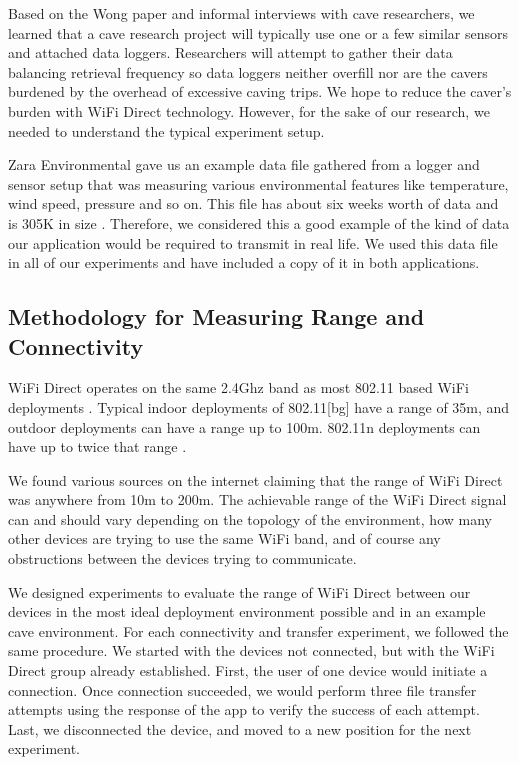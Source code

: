 \documentclass[10pt,twocolumn]{article}
\begin{document}
Based on the Wong paper and informal interviews with cave researchers, we learned that a cave research project will typically use one or a few similar sensors and attached data loggers.
Researchers will attempt to gather their data balancing retrieval frequency so data loggers neither overfill nor are the cavers burdened by the overhead of excessive caving trips.
We hope to reduce the caver's burden with WiFi Direct technology.
However, for the sake of our research, we needed to understand the typical experiment setup.

Zara Environmental gave us an example data file gathered from a logger and sensor setup that was measuring various environmental features like temperature, wind speed, pressure and so on.
This file has about six weeks worth of data and is 305K in size \cite{datafile}.
Therefore, we considered this a good example of the kind of data our application would be required to transmit in real life.
We used this data file in all of our experiments and have included a copy of it in both applications.

\subsection{Methodology for Measuring Range and Connectivity}
\label{sec:Methodology}
WiFi Direct operates on the same 2.4Ghz band as most 802.11 based WiFi deployments \cite{wifiwhitepaper}.
Typical indoor deployments of 802.11[bg] have a range of 35m, and outdoor deployments can have a range up to 100m.
802.11n deployments can have up to twice that range \cite{wikiwifi}.

We found various sources on the internet claiming that the range of WiFi Direct was anywhere from 10m to 200m. 
The achievable range of the WiFi Direct signal can and should vary depending on the topology of the environment, how many other devices are trying to use the same WiFi band, and of course any obstructions between the devices trying to communicate.

We designed experiments to evaluate the range of WiFi Direct between our devices in the most ideal deployment environment possible and in an example cave environment.
For each connectivity and transfer experiment, we followed the same procedure. 
We started with the devices not connected, but with the WiFi Direct group already established.
First, the user of one device would initiate a connection.
Once connection succeeded, we would perform three file transfer attempts using the response of the app to verify the success of each attempt.
Last, we disconnected the device, and moved to a new position for the next experiment.
\end{document}
